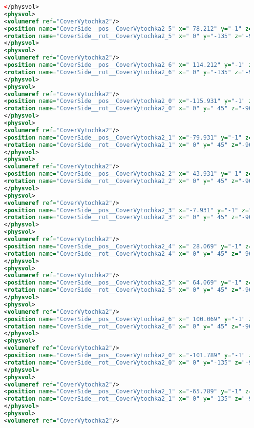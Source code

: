 \begin{lstlisting}[language=XML, firstline=1, lastline=89]
</physvol>
<physvol>
<volumeref ref="CoverVytochka2"/>
<position name="CoverSide__pos__CoverVytochka2_5" x=" 78.212" y="-1" z=" 10.786" unit="mm"/>
<rotation name="CoverSide__rot__CoverVytochka2_5" x=" 0" y="-135" z="-90" unit="deg"/>
</physvol>
<physvol>
<volumeref ref="CoverVytochka2"/>
<position name="CoverSide__pos__CoverVytochka2_6" x=" 114.212" y="-1" z=" 10.786" unit="mm"/>
<rotation name="CoverSide__rot__CoverVytochka2_6" x=" 0" y="-135" z="-90" unit="deg"/>
</physvol>
<physvol>
<volumeref ref="CoverVytochka2"/>
<position name="CoverSide__pos__CoverVytochka2_0" x="-115.931" y="-1" z="-5.357" unit="mm"/>
<rotation name="CoverSide__rot__CoverVytochka2_0" x=" 0" y=" 45" z="-90" unit="deg"/>
</physvol>
<physvol>
<volumeref ref="CoverVytochka2"/>
<position name="CoverSide__pos__CoverVytochka2_1" x="-79.931" y="-1" z="-5.357" unit="mm"/>
<rotation name="CoverSide__rot__CoverVytochka2_1" x=" 0" y=" 45" z="-90" unit="deg"/>
</physvol>
<physvol>
<volumeref ref="CoverVytochka2"/>
<position name="CoverSide__pos__CoverVytochka2_2" x="-43.931" y="-1" z="-5.357" unit="mm"/>
<rotation name="CoverSide__rot__CoverVytochka2_2" x=" 0" y=" 45" z="-90" unit="deg"/>
</physvol>
<physvol>
<volumeref ref="CoverVytochka2"/>
<position name="CoverSide__pos__CoverVytochka2_3" x="-7.931" y="-1" z="-5.357" unit="mm"/>
<rotation name="CoverSide__rot__CoverVytochka2_3" x=" 0" y=" 45" z="-90" unit="deg"/>
</physvol>
<physvol>
<volumeref ref="CoverVytochka2"/>
<position name="CoverSide__pos__CoverVytochka2_4" x=" 28.069" y="-1" z="-5.357" unit="mm"/>
<rotation name="CoverSide__rot__CoverVytochka2_4" x=" 0" y=" 45" z="-90" unit="deg"/>
</physvol>
<physvol>
<volumeref ref="CoverVytochka2"/>
<position name="CoverSide__pos__CoverVytochka2_5" x=" 64.069" y="-1" z="-5.357" unit="mm"/>
<rotation name="CoverSide__rot__CoverVytochka2_5" x=" 0" y=" 45" z="-90" unit="deg"/>
</physvol>
<physvol>
<volumeref ref="CoverVytochka2"/>
<position name="CoverSide__pos__CoverVytochka2_6" x=" 100.069" y="-1" z="-5.357" unit="mm"/>
<rotation name="CoverSide__rot__CoverVytochka2_6" x=" 0" y=" 45" z="-90" unit="deg"/>
</physvol>
<physvol>
<volumeref ref="CoverVytochka2"/>
<position name="CoverSide__pos__CoverVytochka2_0" x="-101.789" y="-1" z="-20.499" unit="mm"/>
<rotation name="CoverSide__rot__CoverVytochka2_0" x=" 0" y="-135" z="-90" unit="deg"/>
</physvol>
<physvol>
<volumeref ref="CoverVytochka2"/>
<position name="CoverSide__pos__CoverVytochka2_1" x="-65.789" y="-1" z="-20.499" unit="mm"/>
<rotation name="CoverSide__rot__CoverVytochka2_1" x=" 0" y="-135" z="-90" unit="deg"/>
</physvol>
<physvol>
<volumeref ref="CoverVytochka2"/>

\end{lstlisting}
